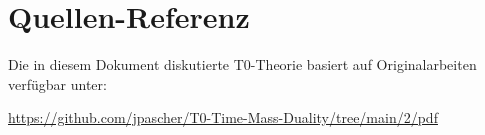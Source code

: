 \documentclass[12pt,a4paper]{report}
\begin{document}
	\section{Quellen-Referenz}
	\label{sec:source_reference}
	
	Die in diesem Dokument diskutierte T0-Theorie basiert auf Originalarbeiten verfügbar unter:
	
	\begin{center}
		\url{https://github.com/jpascher/T0-Time-Mass-Duality/tree/main/2/pdf}
	\end{center}
	
	
\end{document}

